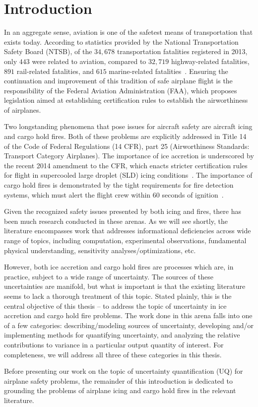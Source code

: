 
\chapter{Introduction\label{ch:intro}}

In an aggregate sense, aviation is one of the safetest means of
transportation that exists today. According to statistics provided by
the National Transportation Safety Board (NTSB), of the $34,678$
transportation fatalities registered in 2013, only $443$ were related
to aviation, compared to $32,719$ highway-related fatalities, $891$
rail-related fatalities, and $615$ marine-related
fatalities~\cite{ntsbStats}. Ensuring the continuation and improvement
of this tradition of safe airplane flight is the responsibility of the
Federal Aviation Administration (FAA), which proposes legislation
aimed at establishing certification rules to establish the
airworthiness of airplanes.

Two longstanding phenomena that pose issues for aircraft safety are
aircraft icing and cargo hold fires. Both of these problems are
explicitly addressed in Title 14 of the Code of Federal Regulations
(14 CFR), part 25 (Airworthiness Standards: Transport Category
Airplanes). The importance of ice accretion is underscored by the
recent 2014 amendment to the CFR, which enacts stricter certification
rules for flight in supercooled large droplet (SLD) icing
conditions~\cite{fedregisterSLD}. The importance of cargo hold fires
is demonstrated by the tight requirements for fire detection systems,
which must alert the flight crew within 60 seconds of
ignition~\cite{CFR}.

Given the recognized safety issues presented by both icing and fires,
there has been much research conducted in these arenas. As we will see
shortly, the literature encompasses work that addresses informational
deficiencies across wide range of topics, including computation,
experimental observations, fundamental physical understanding,
sensitivity analyses/optimizations, etc.

However, both ice accretion and cargo hold fires are processes which
are, in practice, subject to a wide range of uncertainty. The sources
of these uncertainties are manifold, but what is important is that the
existing literature seems to lack a thorough treatment of this
topic. Stated plainly, this is the central objective of this thesis --
to address the topic of uncertainty in ice accretion and cargo hold
fire problems. The work done in this arena falls into one of a few
categories: describing/modeling sources of uncertainty, developing
and/or implementing methods for quantifying uncertainty, and analyzing
the relative contributions to variance in a particular output quantity
of interest. For completeness, we will address all three of these
categories in this thesis.

Before presenting our work on the topic of uncertainty quantification
(UQ) for airplane safety problems, the remainder of this introduction
is dedicated to grounding the problems of airplane icing and cargo
hold fires in the relevant literature.



